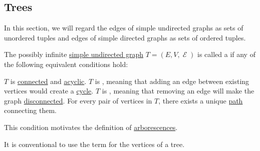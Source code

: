\subsection{Trees}\label{subsec:trees}

In this section, we will regard the edges of simple undirected graphs as sets of unordered tuples and edges of simple directed graphs as sets of ordered tuples.

\begin{definition}\label{def:tree}
  The possibly infinite \hyperref[def:undirected_multigraph]{simple undirected graph} \( T= (E, V, \mscrE) \) is called a  if any of the following equivalent conditions hold:
  \begin{thmenum}
     \( T \) is \hyperref[def:undirected_multigraph_connectedness]{connected} and \hyperref[def:undirected_multigraph_path/cycle]{acyclic}.
     \( T \) is , meaning that adding an edge between existing vertices would create a \hyperref[def:undirected_multigraph_path/cycle]{cycle}.
     \( T \) is , meaning that removing an edge will make the graph \hyperref[def:quiver_connectedness]{disconnected}.
     For every pair of vertices in \( T \), there exists a unique \hyperref[def:undirected_multigraph_path]{path} connecting them.

    This condition motivates the definition of \hyperref[def:arborescence]{arborescences}.
  \end{thmenum}

  It is conventional to use the term  for the vertices of a tree.
\end{definition}
